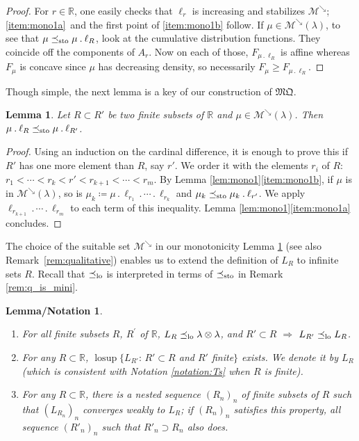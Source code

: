 \documentclass[10pt,a4paper]{article}
\providecommand{\skpt}{\smallskip}
\newcommand{\ldot}{\mathbin{.}}
\newcommand{\lcdots}{\ldot\cdots\ldot}
\theoremstyle{plain}
\newtheorem{lemnotation}[them]{Lemma/Notation}
\newtheorem{lem}[them]{Lemma}
\theoremstyle{definition}
\newcommand{\mq}{\mathfrak{MQ}}
\newcommand{\eqdef}{\coloneqq}
\newcommand{\la}{\lambda}
\newcommand{\R}{\mathbb{R}}
\newcommand{\lcsup}{\operatorname{losup}}
\newcommand{\leqs}{\preceq_{\text{\rm sto}}}
\newcommand{\mdec}{\mathcal{M}^{\scriptscriptstyle\searrow}}
\newcommand{\leqlc}{\preceq_{\rm lo}}
\begin{document}
\begin{proof} For $r\in \R$, one easily checks that $\ell_r$ is increasing and stabilizes $\mdec$; \eqref{item:mono1a}~and the first point of \eqref{item:mono1b} follow. If $\mu\in \mdec(\la)$, to see that $\mu\leqs \mu\ldot\ell_R$, look at the cumulative distribution functions. They coincide off the components of $A_r$. Now on each of those, $F_{\mu\ldot\ell_R}$ is affine whereas $F_\mu$ is concave since $\mu$ has decreasing density, so necessarily $F_\mu\geqslant F_{\mu\ldot\ell_R}$.
\end{proof}

Though simple, the next lemma is a key of our construction of $\mq$.
\begin{lem}\label{lem:mono2}
Let $R\subset R'$ be two finite subsets of\/ $\R$ and $\mu\in\mdec(\la)$. Then $\mu \ldot\ell_R\leqs \mu \ldot\ell_{R'}$.
\end{lem}
\begin{proof}
Using an induction on the cardinal difference, it is enough to prove this if $R'$ has one more element than $R$, say $r'$. We order it with the elements $r_i$ of $R$: $r_1<\cdots<r_k<r'<r_{k+1}<\cdots<r_m$. By Lemma \ref{lem:mono1}\eqref{item:mono1b}, if $\mu$ is in $\mdec(\la)$, so is $\mu_k\eqdef\mu\ldot\ell_{r_1}\lcdots \ell_{r_k}$ and $\mu_k\leqs \mu_k \ldot\ell_{r'}$. We apply $\ell_{r_{k+1}}\lcdots \ell_{r_m}$ to each term of this inequality. Lemma \ref{lem:mono1}\eqref{item:mono1a} concludes.
\end{proof}

\noindent The choice of the suitable set $\mdec$ in our monotonicity Lemma \ref{lem:mono2} (see also Remark~\ref{rem:qualitative}) enables us to extend the definition of $L_R$ to infinite sets $R$. Recall that $\leqlc$ is interpreted in terms of $\leqs$ in Remark \ref{rem:q_is_mini}.

\skpt
\begin{lemnotation}\label{lem:existenceT}
\begin{enumerate}
\item
\label{p1:lem:existenceT} For all finite subsets $R$, $R^{\prime}$ of\/ $\R$, $L_R\leqlc \la\otimes\la$, and $R'\subset R$ $\Rightarrow$ $L_{R'}\leqlc L_{R}$.

\item
\label{p2:def_L_R} For any $R\subset\R$, $\lcsup\{L_{R'}:\,R'\subset R$ and $R'$ finite$\}$ exists. We denote it by $L_R$ (which is consistent with Notation \ref{notation:Ts} when $R$ is finite). 

\item
\label{p3:def_L_R} For any $R\subset\R$, there is a nested sequence $(R_n)_n$ of finite subsets of $R$ such that $(L_{R_n})_n$ converges weakly to $L_R$; if $(R_n)_n$ satisfies this property, all sequence $(R'_n)_n$ such that $R'_n\supset R_n$ also does.
\end{enumerate}
\end{lemnotation}
\end{document}
